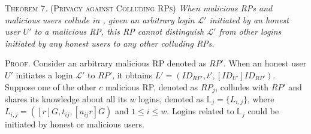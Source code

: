 

\vspace{3mm}
\noindent \textsc{Theorem 7. (Privacy against Colluding RPs)} {\em
When malicious RPs and malicious users collude in \usso, given an arbitrary login $\mathcal{L'}$ initiated by an honest user $U'$ to a malicious RP, this RP cannot distinguish $\mathcal{L'}$ from other logins initiated by any honest users to any other colluding RPs.}




\vspace{0.75mm}
\noindent\textsc{Proof.}
Consider an arbitrary malicious RP denoted as $RP'$. When an honest user $U'$ initiates a login $\mathcal{L'}$ to $RP'$, it obtains $L' = (ID_{RP'}, t', [ID_{U'}]ID_{RP'})$. Suppose one of the other $c$ malicious RP, denoted as $RP_j$, colludes with $RP'$ and shares its knowledge about all its $w$ logins, denoted as $\mathbb{L}_j = \{{L_{i,j}}\}$, where $L_{i,j} = ([r]G, t_{ij}, [u_{ij} r]G)$ and $1 \leq i \leq w$. Logins related to $\mathbb{L}_j$ could be initiated by honest or malicious users. 

